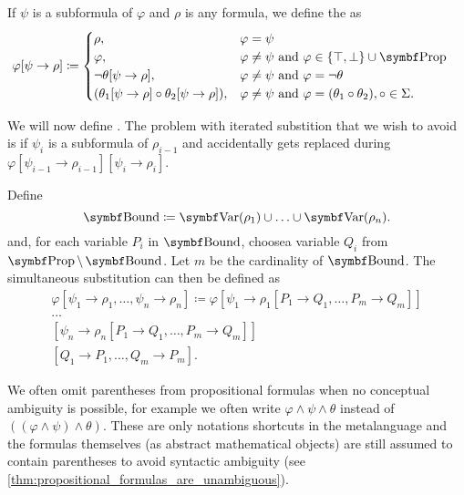 \begin{definition}\label{def:propositional_substition}
  If \( \psi \) is a subformula of \( \varphi \) and \( \rho \) is any formula, we define the  as
  \begin{align*}
    \varphi[\psi \to \rho] &\coloneqq \begin{cases}
      \rho,                                                    &\varphi = \psi \\
      \varphi,                                                 &\varphi \neq \psi \text{ and } \varphi \in \{ \top, \bot \} \cup \Bold{Prop} \\
      \neg \theta[\psi \to \rho],                              &\varphi \neq \psi \text{ and } \varphi = \neg \theta \\
      (\theta_1[\psi \to \rho] \circ \theta_2[\psi \to \rho]), &\varphi \neq \psi \text{ and } \varphi = (\theta_1 \circ \theta_2), \circ \in \Sigma.
    \end{cases}
  \end{align*}

  We will now define . The problem with iterated substition that we wish to avoid is if \( \psi_i \) is a subformula of \( \rho_{i-1} \) and accidentally gets replaced during \( \varphi[\psi_{i-1} \to \rho_{i-1}][\psi_i \to \rho_i] \).

  Define
  \begin{equation*}
    \Bold{Bound} \coloneqq \Bold{Var}(\rho_1) \cup \ldots \cup \Bold{Var}(\rho_n).
  \end{equation*}
  and, for each variable \( P_i \) in \( \Bold{Bound} \), choose\AOC a variable \( Q_i \) from \( \Bold{Prop} \setminus \Bold{Bound} \). Let \( m \) be the cardinality of \( \Bold{Bound} \). The simultaneous substitution can then be defined as
  \begin{align*}
    \varphi[\psi_1 \to \rho_1, \ldots, \psi_n \to \rho_n] \coloneqq \varphi
    [\psi_1 \to \rho_1[P_1 \to Q_1, \ldots, P_m \to Q_m]] \\
    \ldots \\
    [\psi_n \to \rho_n[P_1 \to Q_1, \ldots, P_m \to Q_m]] \\
    [Q_1 \to P_1, \ldots, Q_m \to P_m].
  \end{align*}
\end{definition}

\begin{remark}\label{remark:propositional_formula_parentheses}
  We often omit parentheses from propositional formulas when no conceptual ambiguity is possible, for example we often write \( \varphi \land \psi \land \theta \) instead of \( ((\varphi \land \psi) \land \theta) \). These are only notations shortcuts in the metalanguage and the formulas themselves (as abstract mathematical objects) are still assumed to contain parentheses to avoid syntactic ambiguity (see \cref{thm:propositional_formulas_are_unambiguous}).
\end{remark}

